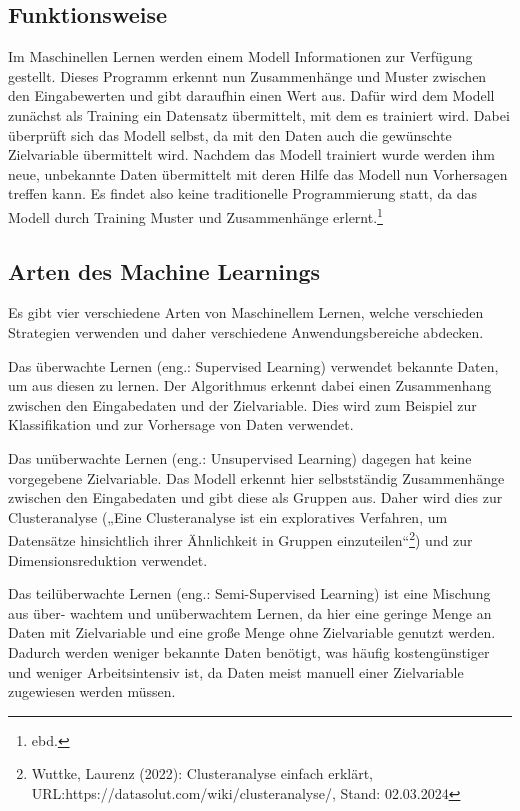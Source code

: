 \documentclass[11pt,oneside]{report}
\begin{document}
\subsection{Funktionsweise}
Im Maschinellen Lernen werden einem Modell Informationen zur Verfügung gestellt. Dieses Programm erkennt nun Zusammenhänge und Muster zwischen den Eingabewerten und gibt daraufhin einen Wert aus. Dafür wird dem Modell zunächst als Training ein Datensatz übermittelt, mit dem es trainiert wird. Dabei überprüft sich das Modell selbst, da mit den Daten auch die gewünschte Zielvariable übermittelt wird. Nachdem das Modell trainiert wurde werden ihm neue, unbekannte Daten übermittelt mit deren Hilfe das Modell nun Vorhersagen treffen kann. Es findet also keine traditionelle Programmierung statt, da das Modell durch Training Muster und Zusammenhänge erlernt.\footnote{ebd.}

\subsection{Arten des Machine Learnings}
Es gibt vier verschiedene Arten von Maschinellem Lernen, welche verschieden Strategien verwenden und daher verschiedene Anwendungsbereiche abdecken.

Das überwachte Lernen (eng.: Supervised Learning) verwendet bekannte Daten, um aus diesen zu lernen. Der Algorithmus erkennt dabei einen Zusammenhang zwischen den Eingabedaten und der Zielvariable. Dies wird zum Beispiel zur Klassifikation und zur Vorhersage von Daten verwendet.

Das unüberwachte Lernen (eng.: Unsupervised Learning) dagegen hat keine vorgegebene Zielvariable. Das Modell erkennt hier selbstständig Zusammenhänge zwischen den Eingabedaten und gibt diese als Gruppen aus. Daher wird dies zur Clusteranalyse („Eine Clusteranalyse ist ein exploratives Verfahren, um Datensätze hinsichtlich ihrer Ähnlichkeit in Gruppen einzuteilen“\footnote{Wuttke, Laurenz (2022): Clusteranalyse einfach erklärt, URL:https://datasolut.com/wiki/clusteranalyse/, Stand: 02.03.2024}) und zur Dimensionsreduktion verwendet.

Das teilüberwachte Lernen (eng.: Semi-Supervised Learning) ist eine Mischung aus über- wachtem und unüberwachtem Lernen, da hier eine geringe Menge an Daten mit Zielvariable und eine große Menge ohne Zielvariable genutzt werden. Dadurch werden weniger bekannte Daten benötigt, was häufig kostengünstiger und weniger Arbeitsintensiv ist, da Daten meist manuell einer Zielvariable zugewiesen werden müssen.
\end{document}
